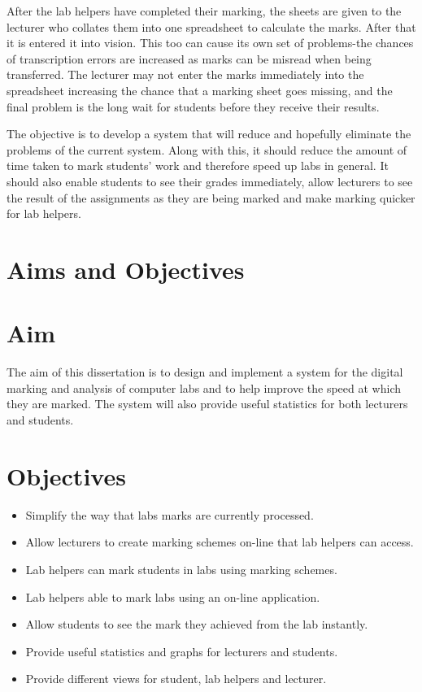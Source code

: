 \documentclass[11pt]{report}
\begin{document}
After the lab helpers have completed their marking, the sheets are given to the lecturer who collates them into one spreadsheet to calculate the marks. After that it is entered it into vision. This too can cause its own set of problems-the chances of transcription errors are increased as marks can be misread  when being transferred. The lecturer may not enter the marks immediately into the spreadsheet increasing the chance that a marking sheet goes missing, and the final problem is the long wait for students before they  receive their results.

The objective is to develop a system that will reduce and hopefully eliminate the problems of the current system. Along with this, it should  reduce the amount of time taken to mark students’ work and therefore speed up labs in general. It should also enable students to see their grades immediately, allow lecturers to see the result of the assignments as they are being marked and make marking quicker for lab helpers.




\newpage
\section{Aims and Objectives}
\section{Aim}
The aim of this dissertation is to design and implement a system for the digital marking and analysis of computer labs and to help improve the speed at which they are marked. The system will also provide useful statistics for both lecturers and students.

\section{Objectives}
\label{section:object}
\begin{itemize}
\item Simplify the way that labs marks are currently processed.
\item Allow lecturers to create marking schemes on-line that lab helpers can access. 
\item Lab helpers can mark students in labs using marking schemes.
\item Lab helpers able to mark labs using an on-line application.
\item Allow students to see the mark they achieved from the lab instantly.
\item Provide useful statistics and graphs for lecturers and students.
\item Provide different views for student, lab helpers and lecturer.
\end{itemize}
\end{document}
